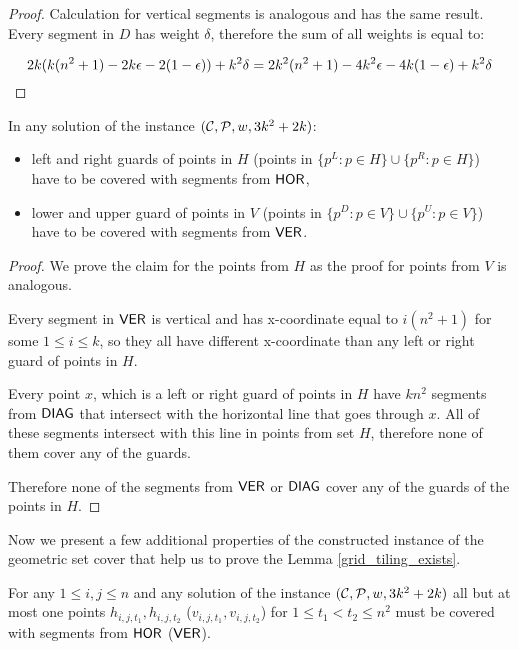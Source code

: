 {{{{\begin{proof}
Calculation for vertical segments is analogous and has the same result.
Every segment in $D$ has weight $\delta$, therefore the sum of all weights
is equal to:

$$2k(k(n^2+1) -2k\epsilon -2(1-\epsilon)) + k^2\delta= 2k^2(n^2+1) - 4k^2\epsilon -4k(1-\epsilon) +k^2\delta$$
\end{proof}


\begin{claim}
\label{guards}
In any solution of the instance $(\mathcal{C}, \mathcal{P}, w, 3k^2+2k)$:
\begin{itemize}
\item left and right guards of points in $H$
(points in $\{p^L : p \in H\} \cup \{p^R : p \in H\}$)
have to be covered with segments from $\mathsf{HOR}$,
\item lower and upper guard of points in $V$
(points in $\{p^D : p \in V\} \cup \{p^U : p \in V\}$)
have to be covered with segments from $\mathsf{VER}$.
\end{itemize}
\end{claim}

\begin{proof}
We prove the claim for the points from $H$
as the proof for points from $V$ is analogous.

Every segment in $\mathsf{VER}$ is vertical and 
has x-coordinate equal to $i(n^2+1)$ for some $1\le i \le k$,
so they all have different x-coordinate
than any left or right guard of points in $H$.

Every point $x$, which is a left or right guard of points in $H$
have $kn^2$ segments from $\mathsf{DIAG}$ that intersect with the horizontal
line that goes through $x$. All of these segments intersect with
this line in points from set $H$, therefore none of them
cover any of the guards.

Therefore none of the segments from $\mathsf{VER}$ or $\mathsf{DIAG}$ cover any
of the guards of the points in $H$.
\end{proof}

Now we present a few additional properties of the constructed instance
of the geometric set cover that help us to prove
the Lemma \ref{grid_tiling_exists}.

\begin{claim}
\label{one_diag_in_square}
For any $1 \le i, j \le n$
and any solution of the instance $(\mathcal{C}, \mathcal{P}, w, 3k^2+2k)$
all but at most one points $h_{i, j, t_1}, h_{i, j, t_2}$
($v_{i, j, t_1}, v_{i, j, t_2}$)
for $1 \le t_1 < t_2 \le n^2$
must be
covered with segments from $\mathsf{HOR}$ ($\mathsf{VER}$).
\end{claim}

}}}}
